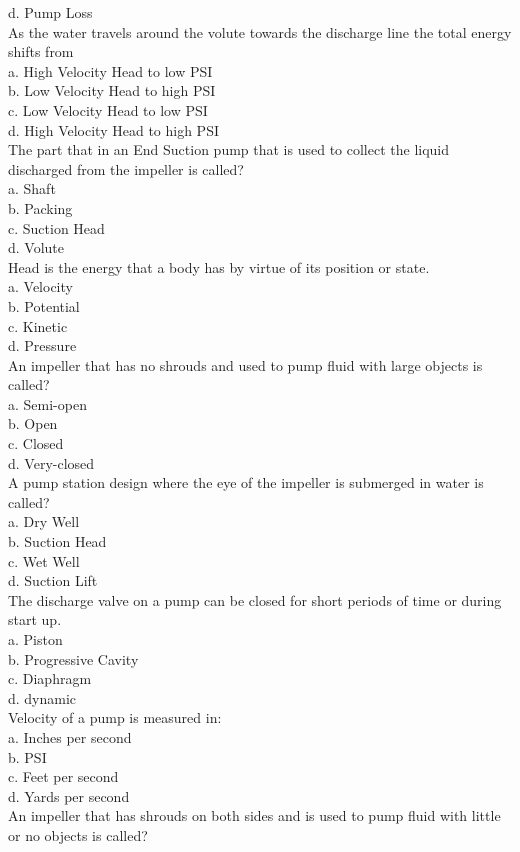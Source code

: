 d.	Pump Loss\\
As the water travels around the volute towards the discharge line the total energy\\
shifts from\\
a.	High Velocity Head to low PSI\\
b.	Low Velocity Head to high PSI\\
c.	Low Velocity Head to low PSI \\
d.	High Velocity Head to high PSI\\
The part that in an End Suction pump that is used to collect the liquid discharged from the impeller is called?\\
a.	Shaft\\
b.	Packing\\
c.	Suction Head\\
d.	Volute\\
Head is the energy that a body has by virtue of its position or state.\\
a.	Velocity\\
b.	Potential\\
c.	Kinetic\\
d.	Pressure\\
An impeller that has no shrouds and used to pump fluid with large objects is called?\\
a.	Semi-open\\
b.	Open\\
c.	Closed\\
d.	Very-closed\\
A pump station design where the eye of the impeller is submerged in water is called?\\
a.	Dry Well\\
b.	Suction Head\\
c.	Wet Well\\
d.	Suction Lift\\
The discharge valve on a 	pump can be closed for short periods of time or during start up.\\
a.	Piston\\
b.	Progressive Cavity\\
c.	Diaphragm\\
d.	dynamic\\
Velocity of a pump is measured in:\\
a.	Inches per second\\
b.	PSI\\
c.	Feet per second\\
d.	Yards per second\\
An impeller that has shrouds on both sides and is used to pump fluid with little or no objects is called?\\
